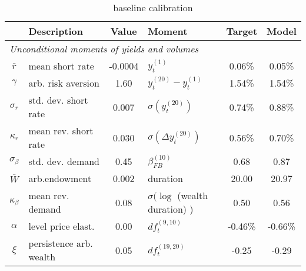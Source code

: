 \begin{table}[htbp]  
\centering  
\bgroup  
\def\arraystretch{1.25}  
\begin{tabular}{clclcc} \hline  
& Description & Value & Moment & Target & Model \\ \hline  
\multicolumn{6}{l}{\emph{Unconditional moments of yields and volumes}} \\  
$\bar{r}$  & mean short rate & -0.0004  & $y_{t}^{(1)}$ & 0.06\% & 0.05\%   \\ 
$\gamma$  & arb. risk aversion & 1.60  & $y_{t}^{(20)}-y_{t}^{(1)}$ & 1.54\% & 1.54\%   \\ 
$\sigma_r$ & std. dev. short rate & 0.007 & $\sigma ( y_{t}^{(20)} )$  & 0.74\% & 0.88\% \\ 
$\kappa_r$ & mean rev. short rate & 0.030 & $\sigma (\Delta y_{t}^{(20)})$ & 0.56\% & 0.70\% \\ 
$\sigma_{\beta}$ & std. dev. demand & 0.45 & $ \beta^{(10)}_{FB} $ & 0.68 & 0.87 \\ 
$\bar{W}$ & arb.endowment & 0.002 & duration & 20.00 & 20.97 \\ 
$\kappa_{\beta}$ & mean rev. demand & 0.08 & $\sigma (\log $ (wealth duration) ) & 0.50 & 0.56 \\ 
$\alpha$ & level price elast. & 0.00 & $ df_t^{(9,10)} $ & -0.46\% & -0.66\% \\ 
$\xi$ & persistence arb. wealth & 0.05 & $ df_t^{(19,20)} $ & -0.25 & -0.29 \\ 
\end{tabular} 
\egroup 
\caption{baseline calibration} 
\label{tab:cal} 
\end{table} 
